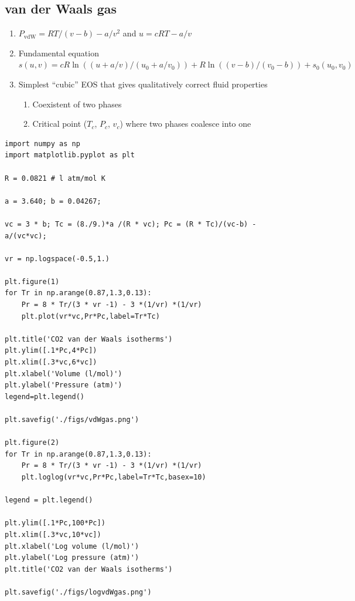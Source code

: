 \documentclass[11pt]{article}
\begin{document}
\subsection{van der Waals gas}
\label{sec:org8e6141d}
\begin{enumerate}
\item \(P_\text{vdW}=RT/(v-b) - a/v^2\) and \(u = cRT - a/v\)
\item Fundamental equation \(s(u,v)=cR \ln((u+a/v)/(u_0+a/v_0))+R  \ln ((v-b)/(v_0-b)) + s_0(u_0,v_0)\)
\item Simplest ``cubic'' EOS that gives qualitatively correct fluid properties
\begin{enumerate}
\item Coexistent of two phases
\item Critical point (\(T_c\), \(P_c\), \(v_c\)) where two phases coalesce into one
\end{enumerate}
\end{enumerate}

\begin{verbatim}
import numpy as np
import matplotlib.pyplot as plt

R = 0.0821 # l atm/mol K

a = 3.640; b = 0.04267;

vc = 3 * b; Tc = (8./9.)*a /(R * vc); Pc = (R * Tc)/(vc-b) - a/(vc*vc);

vr = np.logspace(-0.5,1.)

plt.figure(1)
for Tr in np.arange(0.87,1.3,0.13):
    Pr = 8 * Tr/(3 * vr -1) - 3 *(1/vr) *(1/vr)
    plt.plot(vr*vc,Pr*Pc,label=Tr*Tc)

plt.title('CO2 van der Waals isotherms')
plt.ylim([.1*Pc,4*Pc])
plt.xlim([.3*vc,6*vc])
plt.xlabel('Volume (l/mol)')
plt.ylabel('Pressure (atm)')
legend=plt.legend()

plt.savefig('./figs/vdWgas.png')

plt.figure(2)
for Tr in np.arange(0.87,1.3,0.13):
    Pr = 8 * Tr/(3 * vr -1) - 3 *(1/vr) *(1/vr)
    plt.loglog(vr*vc,Pr*Pc,label=Tr*Tc,basex=10)

legend = plt.legend()

plt.ylim([.1*Pc,100*Pc])
plt.xlim([.3*vc,10*vc])
plt.xlabel('Log volume (l/mol)')
plt.ylabel('Log pressure (atm)')
plt.title('CO2 van der Waals isotherms')

plt.savefig('./figs/logvdWgas.png')
\end{verbatim}
\end{document}
